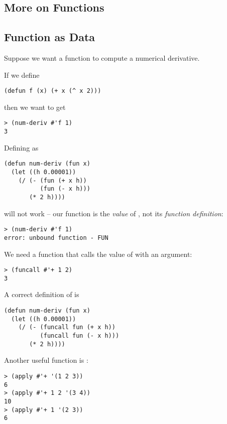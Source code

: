 \begin{slide}{}
\section{More on Functions}
\subsection{Function as Data}
Suppose we want a function  to compute a numerical
derivative.

If we define
{\Large
\begin{verbatim}
(defun f (x) (+ x (^ x 2)))
\end{verbatim}}
then we want to get
{\Large
\begin{verbatim}
> (num-deriv #'f 1)
3
\end{verbatim}}
Defining  as
{\Large
\begin{verbatim}
(defun num-deriv (fun x)
  (let ((h 0.00001))
    (/ (- (fun (+ x h))
          (fun (- x h)))
       (* 2 h))))
\end{verbatim}}
will not work -- our function is the {\em value} of ,
not its {\em function definition}:
{\Large
\begin{verbatim}
> (num-deriv #'f 1)
error: unbound function - FUN
\end{verbatim}}
\end{slide}

\begin{slide}{}
We need a function that calls the value of  with an
argument:
{\Large
\begin{verbatim}
> (funcall #'+ 1 2)
3
\end{verbatim}}
A correct definition of  is
{\Large
\begin{verbatim}
(defun num-deriv (fun x)
  (let ((h 0.00001))
    (/ (- (funcall fun (+ x h))
          (funcall fun (- x h)))
       (* 2 h))))
\end{verbatim}}
Another useful function is :
{\Large
\begin{verbatim}
> (apply #'+ '(1 2 3))
6
> (apply #'+ 1 2 '(3 4))
10
> (apply #'+ 1 '(2 3))
6
\end{verbatim}}
\end{slide}

